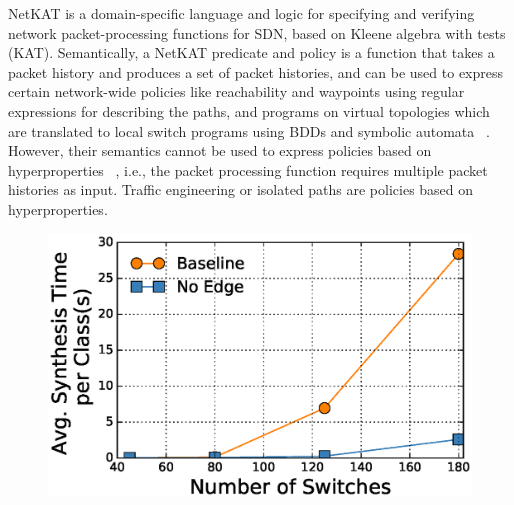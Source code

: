 NetKAT is a domain-specific language and logic for 
specifying and verifying network packet-processing functions
for SDN, based on Kleene algebra with tests (KAT). Semantically,
a NetKAT predicate and policy is a function that takes a packet
history and produces a set of packet histories, and can be used
to express certain network-wide policies like reachability 
and waypoints using regular expressions for describing the paths, 
and programs on virtual topologies which are translated to local
switch programs using BDDs and symbolic automata
~\cite{netkatcompiler}. However, their semantics
cannot be used to express policies based on hyperproperties
~\cite{hyperproperties}, i.e., 
the packet processing function requires multiple packet histories
as input. Traffic engineering or isolated paths are policies
based on hyperproperties. 
\begin{figure}[t]
	\centering
	\includegraphics[width=0.65\columnwidth]{figures/linkTopology.eps}
	\label{fig:link-capacity}
\end{figure}


